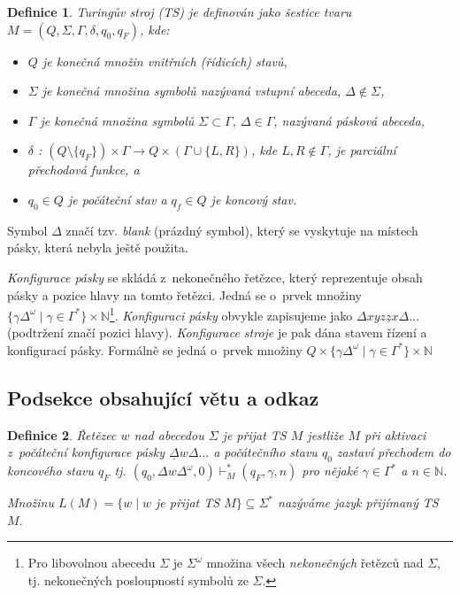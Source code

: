 \documentclass[11pt, a4paper,twocolumn]{article}
\def \fnote {Pro libovolnou abecedu $\Sigma$ je $\Sigma^\omega$ množina všech \emph{nekonečných} řetězců nad $\Sigma$, tj. nekonečných posloupností symbolů ze $\Sigma$.}
\newtheorem{definition}{Definice}
\begin{document}
\begin{definition} \label{def:def1}
\textnormal{Turingův stroj} (TS) je definován jako šestice tvaru $M = (Q, \Sigma, \Gamma, \delta, q_0, q_F)$, kde:
\begin{itemize}
  \setlength\itemsep{0.05em}
  \item $Q$ je konečná množin \textnormal{vnitřních (řídicích) stavů},
  \item $\Sigma$ je konečná množina symbolů nazývaná \textnormal{vstupní abeceda}, $\Delta \notin \Sigma $, 
  \item $\Gamma$ je konečná množina symbolů $\Sigma \subset \Gamma$, $\Delta \in \Gamma$, nazývaná \textnormal{pásková abeceda},
  \item $\delta$ : $(Q \setminus \{q_F\}) \times \Gamma \to Q \times (\Gamma \cup \{L,R\})$, kde $L,R \notin \Gamma$, je parciální \textnormal{přechodová funkce}, a
  \item $q_0\in Q$ je \textnormal{počáteční stav} a $q_f \in Q$ je \textnormal{koncový stav}.
\end{itemize}
\end{definition}

Symbol $\Delta$ značí tzv. \emph{blank} (prázdný symbol), který se vyskytuje na místech pásky, která nebyla ještě použita.

\emph{Konfigurace pásky} se skládá z~nekonečného řetězce, který reprezentuje obsah pásky a pozice hlavy na tomto řetězci. Jedná se o~prvek množiny ${\{ \gamma \Delta^\omega \mid \gamma \in \Gamma^\ast \} \times \mathbb{N}}$\footnote{\fnote}.
\emph{Konfiguraci pásky} obvykle zapisujeme jako ${\Delta xyz \underline{z}x \Delta\ldots}$ (podtržení značí pozici hlavy). \emph{Konfigurace stroje} je pak dána stavem řízení a konfigurací pásky. Formálně se jedná o~prvek množiny ${Q \times \{\gamma \Delta^\omega \mid \gamma \in \Gamma^\ast \} \times \mathbb{N}}$ 

\subsection{Podsekce obsahující větu a odkaz}
\begin{definition} \label{def:def2}
\textnormal{Řetězec $w$ nad abecedou $\Sigma$ je přijat TS $M$} jestliže $M$ při aktivaci z~počáteční konfigurace pásky
$\underline{\Delta}w\Delta\ldots$ a počátečního stavu $q_0$ zastaví přechodem do koncového stavu $q_F$ tj. $(q_0,\Delta w\Delta^\omega,0)  \vdash_M^* (q_F,\gamma,n)$ pro nějaké $\gamma \in \Gamma^\ast  $ a $n \in \mathbb{N}$.

Množinu $L(M) = \{w\!\mid\! w$ je přijat TS $M\}  \subseteq \Sigma^\ast $ na\-zý\-vá\-me jazyk přijímaný \textnormal{TS} $M$.
\end{definition}
\end{document}
